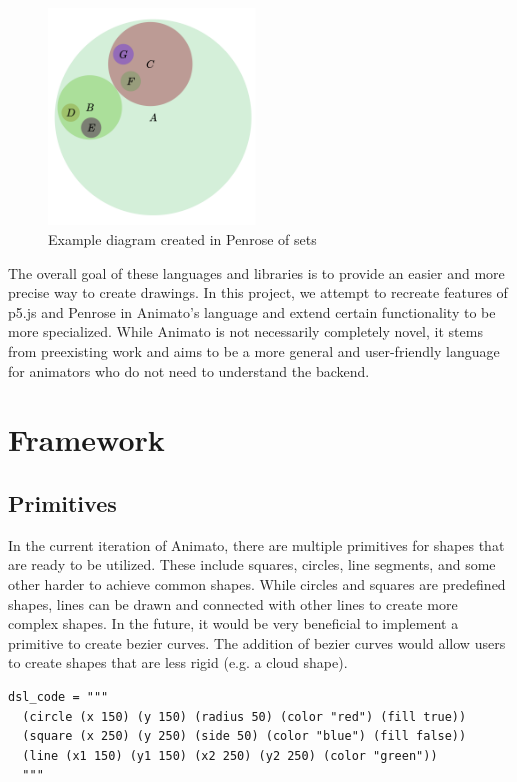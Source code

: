 \documentclass[acmsmall,screen]{acmart}
\begin{document}
\begin{center}
  \begin{figure}[!h]
    \includegraphics[width=0.49\textwidth]{images/penrose.png}
    \caption{Example diagram created in Penrose of sets}
  \end{figure}
\end{center}

\noindent The overall goal of these languages and libraries is to provide an easier and more precise way to create drawings.
In this project, we attempt to recreate features of p5.js and Penrose in Animato's language and extend certain functionality to be more specialized.
While Animato is not necessarily completely novel, it stems from preexisting work and aims to be a more general and user-friendly language for animators who do not need to understand the backend.

\section{Framework}
\subsection{Primitives}
In the current iteration of Animato, there are multiple primitives for shapes that are ready to be utilized.
These include squares, circles, line segments, and some other harder to achieve common shapes. 
While circles and squares are predefined shapes, lines can be drawn and connected with other lines to create more complex shapes.
In the future, it would be very beneficial to implement a primitive to create bezier curves.
The addition of bezier curves would allow users to create shapes that are less rigid (e.g. a cloud shape).


\begin{lstlisting}[label=code, caption=Sample input demonstrating primitives and customizations]
  dsl_code = """
  (circle (x 150) (y 150) (radius 50) (color "red") (fill true))
  (square (x 250) (y 250) (side 50) (color "blue") (fill false))
  (line (x1 150) (y1 150) (x2 250) (y2 250) (color "green"))
  """
\end{lstlisting}
\end{document}
